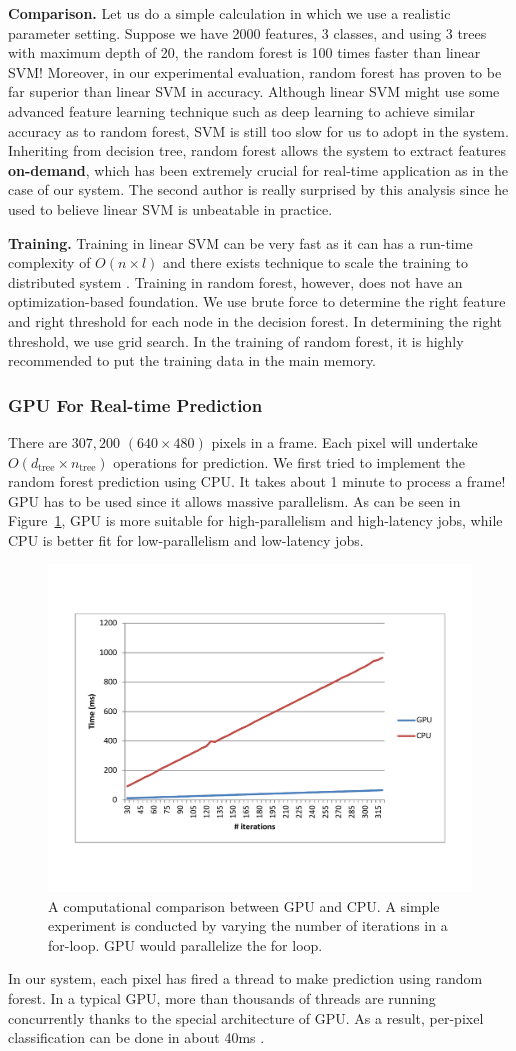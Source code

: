 \textbf{Comparison.} Let us do a simple calculation in which we use a realistic parameter setting. Suppose we have 2000 features, 3 classes, and using 3 trees with maximum depth of 20, the random forest is 100 times faster than linear SVM! Moreover, in our experimental evaluation, random forest has proven to be far superior than linear SVM in accuracy. Although linear SVM might use some advanced feature learning technique such as deep learning to achieve similar accuracy as to random forest, SVM is still too slow for us to adopt in the system. Inheriting from decision tree, random forest allows the system to extract features \textbf{on-demand}, which has been extremely crucial for real-time application as in the case of our system. The second author  is really surprised by this analysis since he used to believe linear SVM is unbeatable in practice.  




\textbf{Training.} Training in linear SVM can be very fast as it can has a run-time complexity of $O(n\times l)$ and there exists technique to scale the training to distributed system . Training in random forest, however, does not have an optimization-based foundation. We use brute force to determine the right feature and right threshold for each node in the decision forest. In determining the right threshold, we use grid search. In the training of random forest, it is highly recommended to put the training data in the main memory. 


\subsubsection{GPU For Real-time Prediction} 
There are $307,200$ $(640\times 480)$ pixels in a frame. Each pixel will undertake $O(d_{\text{tree}}\times n_{\text{tree}})$ operations for prediction. We first tried to implement the random forest prediction using CPU. It takes about 1 minute to process a frame! GPU has to be used since it allows massive parallelism. As can be seen in Figure~\ref{fig: GPUvsCPU}, GPU is more suitable for high-parallelism and high-latency jobs, while CPU is better fit for low-parallelism and low-latency jobs. 

\begin{figure}
	\includegraphics[width=0.45 \textwidth]{fig/GPUvsCPU.pdf}   
    \caption{A computational comparison between GPU and CPU. A simple experiment is conducted by varying the number of iterations in a for-loop. GPU would parallelize the for loop.}
    \label{fig: GPUvsCPU}
\end{figure}

In our system, each pixel has fired a thread to make prediction using random forest. In a typical GPU, more than thousands of threads are running concurrently thanks to the special architecture of GPU. As a result, per-pixel classification can be done in about 40ms .    
